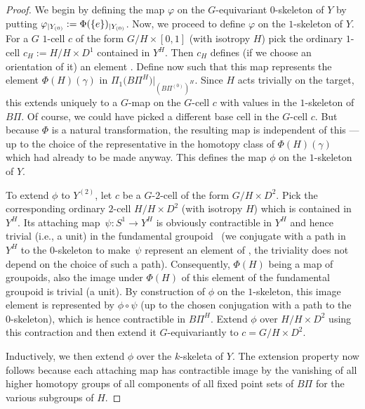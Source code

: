 \documentclass[pdftex]{sigma}
\numberwithin{equation}{section}
\begin{document}
	
	\begin{proof}
		We begin by defining the map $\varphi$ on the $G$-equivariant $0$-skeleton of $Y$ by putting
		$\varphi_{|Y_{(0)}}:=\smash{\Phi(\{e\})_{|Y_{(0)}}}$.
		Now, we proceed to define $\varphi$ on the $1$-skeleton of $Y$. For a $G$
		$1$-cell
		$c$ of the form $G/H\times [0,1]$ (with isotropy $H$) pick the ordinary
		$1$-cell $c_H:=H/H\times D^1$ contained in $Y^H$. Then $c_H$
		defines (if we choose an orientation of it) an element . Define now  such that
		this map represents the element $\Phi(H)(\gamma)$ in
		$\Pi_1\bigl(B\Pi^H\bigr)|_{ (B\Pi^{ (0)} )^H}$. Since $H$ acts trivially on the target, this extends
		uniquely to a $G$-map on the $G$-cell $c$ with values in the
		$1$-skeleton of $B\Pi$. Of course, we could have picked a different base cell
		in the $G$-cell $c$. But because $\Phi$ is a natural transformation, the
		resulting map is independent of this ---up to the choice of the representative in the
		homotopy class of $\Phi(H)(\gamma)$ which had already to be made anyway.
		This defines the map $\phi$ on the $1$-skeleton of $Y$.
		
		To extend $\phi$ to $Y^{(2)}$, let $c$ be a $G$-$2$-cell of the form
		$G/H\times D^2$. Pick the corresponding ordinary $2$-cell $H/H\times
		D^2$ (with isotropy $H$)
		which is contained in $Y^{H}$. Its attaching map~${\psi\colon S^1\to Y^{H}}$
		is obviously contractible in $Y^{H}$ and hence trivial (i.e., a unit) in
		the fundamental groupoid~ (we conjugate with a path in
		$Y^H$ to the $0$-skeleton to make~$\psi$
		represent an element of , the triviality does not
		depend on the choice of such a path). Consequently, $\Phi(H)$ being a map of
		groupoids, also the image under $\Phi(H)$ of this element of the fundamental
		groupoid is trivial (a unit). By construction of $\phi$ on the $1$-skeleton,
		this image element is represented by $\phi\circ\psi$ (up to the chosen
		conjugation with a path to the $0$-skeleton), which is hence contractible in
		$B\Pi^H$. Extend $\phi$ over $H/H\times D^2$ using this contraction and then
		extend it $G$-equivariantly to $c=G/H\times D^2$.
		
		Inductively, we then extend $\phi$ over the $k$-skeleta of $Y$. The extension
		property now follows because each attaching map has contractible image by the
		vanishing of all higher homotopy groups of all components of all fixed point
		sets of $B\Pi$ for the various subgroups of $H$.
		

\end{proof}
\end{document}
